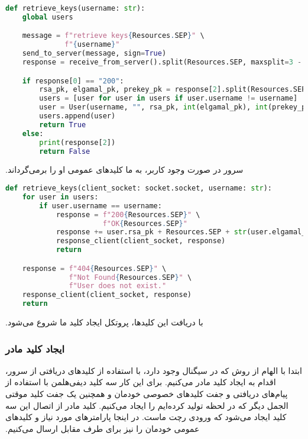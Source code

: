 \begin{latin}
\begin{lstlisting}[firstnumber=327, language=Python]
def retrieve_keys(username: str):
    global users

    message = f"retrieve keys{Resources.SEP}" \
              f"{username}"
    send_to_server(message, sign=True)
    response = receive_from_server().split(Resources.SEP, maxsplit=3 - 1)

    if response[0] == "200":
        rsa_pk, elgamal_pk, prekey_pk = response[2].split(Resources.SEP)
        users = [user for user in users if user.username != username]
        user = User(username, "", rsa_pk, int(elgamal_pk), int(prekey_pk))
        users.append(user)
        return True
    else:
        print(response[2])
        return False
\end{lstlisting}
\end{latin}
‫
‫
‫سرور در صورت وجود کاربر، به ما کلیدهای عمومی او را برمی‌گرداند.
‫
\begin{latin}
\begin{lstlisting}[firstnumber=165, language=Python]
def retrieve_keys(client_socket: socket.socket, username: str):
    for user in users:
        if user.username == username:
            response = f"200{Resources.SEP}" \
                       f"OK{Resources.SEP}"
            response += user.rsa_pk + Resources.SEP + str(user.elgamal_pk) + Resources.SEP + str(user.prekey_pk)
            response_client(client_socket, response)
            return

    response = f"404{Resources.SEP}" \
               f"Not Found{Resources.SEP}" \
               f"User does not exist."
    response_client(client_socket, response)
    return
\end{lstlisting}
\end{latin}
‫
‫با دریافت این کلیدها، پروتکل ایجاد کلید ما شروع می‌شود.
‫\subsubsection{ایجاد کلید مادر}
‫ابتدا با الهام از روش  که در سیگنال وجود دارد، با استفاده از کلیدهای دریافتی از سرور، اقدام به ایجاد کلید مادر می‌کنیم. برای این کار سه کلید دیفی‌هلمن با استفاده از پیام‌های دریافتی و جفت کلید‌های خصوصی خودمان و همچنین یک جفت کلید موقتی الجمل دیگر که در لحظه تولید کرده‌ایم را ایجاد می‌کنیم. کلید مادر از اتصال این سه کلید ایجاد می‌شود که ورودی رچت ماست. در اینجا پارامترهای مورد نیاز و کلیدهای عمومی خودمان را نیز برای طرف مقابل ارسال می‌کنیم.
‫
